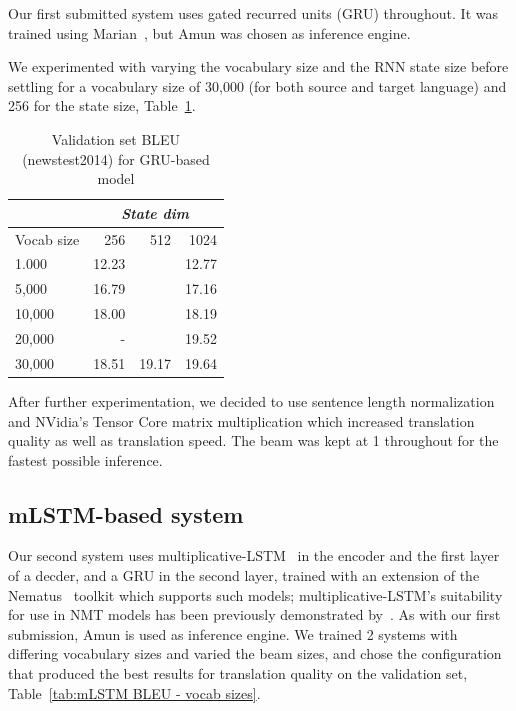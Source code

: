 \documentclass[11pt,a4paper]{article}
\begin{document}

Our first submitted system uses gated recurred units (GRU) throughout. It was trained using Marian~\citep{junczys2018marian}, but Amun was chosen as inference engine.

We experimented with varying the vocabulary size and the RNN state size before settling for a vocabulary size of 30,000 (for both source and target language) and 256 for the state size, Table~\ref{tab:BLEU for newstest2014}.

\begin{table}
\begin{center}
\begin{tabular}{|l|r|r|r|} \hline
		& \multicolumn{3}{|c|}{\emph{State dim}}	\\ \hline	
Vocab size	& 256	& 512	& 1024 \\ \hline
1.000 		& 12.23 &	& 12.77 \\ 
5,000		& 16.79	&  	& 17.16 \\ 
10,000		& 18.00	& 	& 18.19 \\
20,000		& -	&	& 19.52 \\ 
30,000		& 18.51	& 19.17	& 19.64 \\ \hline
\end{tabular}
\end{center}
\caption{Validation set BLEU (newstest2014) for GRU-based model}
\label{tab:BLEU for newstest2014}
\end{table}

After further experimentation, we decided to use sentence length normalization and NVidia's Tensor Core matrix multiplication which increased translation quality as well as translation speed. The beam was kept at 1 throughout for the fastest possible inference.

\subsection{mLSTM-based system}

Our second system uses multiplicative-LSTM~\citep{krause2017} in the encoder and the first layer of a decder, and a GRU in the second layer, trained with an extension of the Nematus~\citep{sennrich-EtAl:2017:EACLDemo} toolkit which supports such models; multiplicative-LSTM's suitability for use in NMT models has been previously demonstrated by~\citet{pinnis2017}.
As with our first submission, Amun is used as inference engine.
We trained 2 systems with differing vocabulary sizes and varied the beam sizes, and chose the configuration that produced the best results for translation quality on the validation set, Table~\ref{tab:mLSTM BLEU - vocab sizes}. 
\end{document}
